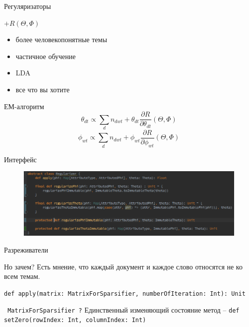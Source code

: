 \documentclass{beamer}
\begin{document}
\begin{frame}{Регуляризаторы}
    \begin{block}{$+R(\Theta, \Phi)$}
	\begin{itemize}
	    \item более человекопонятные темы
	    \item частичное обучение
	    \item LDA
	    \item все что вы хотите
	\end{itemize}
    \end{block}

    \begin{block}{ЕМ-алгоритм}
	$$ \theta_{dt} \propto\sum_d n_{dwt}   + \theta_{dt}\frac{\partial R}{\partial \theta_{dt}} (\Theta, \Phi) $$
	$$\phi_{wt} \propto \sum_d n_{dwt} + \phi_{wt}\frac{\partial R}{\partial \phi_{wt}} (\Theta, \Phi)$$
    \end{block}
\end{frame}

\begin{frame}{Интерфейс}
    \begin{figure}[ht!]
	\centering
	\includegraphics[width=115mm]{regularizer}
	\label{overflow}
    \end{figure}
\end{frame}


\begin{frame}{Разреживатели}
    \begin{block}{Но зачем?}
	Есть мнение, что каждый документ и каждое слово относятся не ко всем темам.

	\texttt{def apply(matrix: MatrixForSparsifier, numberOfIteration: Int): Unit}
    \end{block}

    \begin{block}{\texttt{ MatrixForSparsifier ?}}
	Единственный изменяющий состояние метод --
	\texttt{def setZero(rowIndex: Int, columnIndex: Int)}
    \end{block}
\end{frame}
\end{document}
